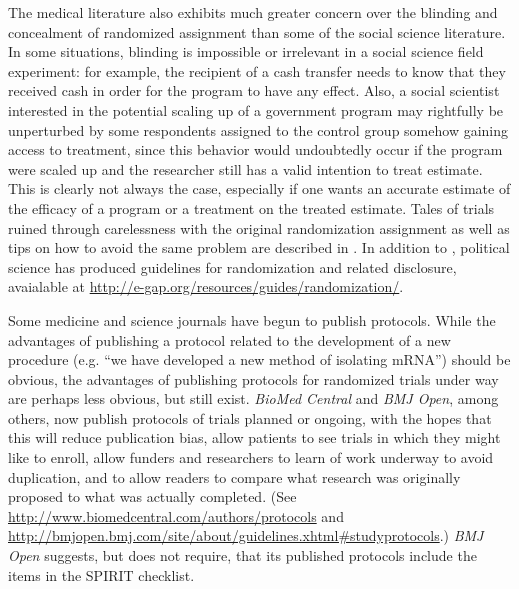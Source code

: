 \documentclass[12pt] {article}
\begin{document}
The medical literature also exhibits much greater concern over the blinding and concealment of randomized assignment than some of the social science literature. In some situations, blinding is impossible or irrelevant in a social science field experiment: for example, the recipient of a cash transfer needs to know that they received cash in order for the program to have any effect. Also, a social scientist interested in the potential scaling up of a government program may rightfully be unperturbed by some respondents assigned to the control group somehow gaining access to treatment, since this behavior would undoubtedly occur if the program were scaled up and the researcher still has a valid intention to treat estimate.  This is clearly not always the case, especially if one wants an accurate estimate of the efficacy of a program or a treatment on the treated estimate. Tales of trials ruined through carelessness with the original randomization assignment as well as tips on how to avoid the same problem are described in \cite{schulz_allocation_2002}. In addition to \cite{bruhn_pursuit_2009}, political science has produced guidelines for randomization and related disclosure, avaialable at \url{http://e-gap.org/resources/guides/randomization/}.


 Some medicine and science journals have begun to publish protocols.   While the
advantages of publishing a protocol related to the development of a new
procedure (e.g. ``we have developed a new method of isolating mRNA'')
should be obvious, the advantages of publishing protocols for randomized
trials under way are perhaps less obvious, but still exist. \emph{BioMed
Central} and \emph{BMJ Open}, among others, now publish protocols of
trials planned or ongoing, with the hopes that this will reduce
publication bias, allow patients to see trials in which they might like
to enroll, allow funders and researchers to learn of work underway to
avoid duplication, and to allow readers to compare what research was
originally proposed to what was actually completed. (See
\url{http://www.biomedcentral.com/authors/protocols} and
\url{http://bmjopen.bmj.com/site/about/guidelines.xhtml\#studyprotocols}.)
\emph{BMJ Open} suggests, but does not require, that its published
protocols include the items in the SPIRIT checklist.
\end{document}
